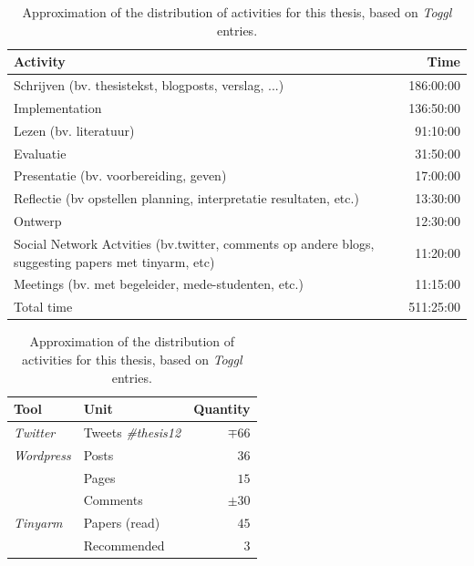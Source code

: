 \begin{table}%

	\caption{Approximation of the distribution of activities for this thesis, based on \emph{Toggl} entries.}
	
	\begin{center}
		\begin{tabular}{ p{350px} | r }
			\hline
			\textbf{Activity} & \textbf{Time} \\
			\hline
			Schrijven (bv. thesistekst, blogposts, verslag, ...) 																								& 186:00:00 \\
			Implementation 																																											& 136:50:00 \\
			Lezen (bv. literatuur) 																																							& 91:10:00 \\
			Evaluatie 																																													& 31:50:00 \\
			Presentatie (bv. voorbereiding, geven) 																															& 17:00:00 \\
			Reflectie (bv opstellen planning, interpretatie resultaten, etc.) 																	& 13:30:00 \\
			Ontwerp 																																														& 12:30:00 \\
			Social Network Actvities (bv.twitter, comments op andere blogs, suggesting papers met tinyarm, etc) & 11:20:00 \\
			Meetings (bv. met begeleider, mede-studenten, etc.) 																								& 11:15:00 \\
			\hline
			\hline
			Total time 																																													& 511:25:00 \\
			\hline
		\end{tabular}
	\end{center}
	\label{table:toggl:stats}
\end{table}


\begin{table}%

	\caption{Approximation of the distribution of activities for this thesis, based on \emph{Toggl} entries.}
	
	\begin{center}
		\begin{tabular}{ l | l | r }
			\hline
			\textbf{Tool} 		& \textbf{Unit} 						& \textbf{Quantity} \\
			\hline
			\emph{Twitter} 		& Tweets \emph{\#thesis12}	& $\mp66$		\\
			\emph{Wordpress}	& Posts 										& $36$		\\
												& Pages 										& $15$		\\
												& Comments 									& $\pm30$	\\
			\emph{Tinyarm}		& Papers (read)							&	$45$		\\
												& Recommended								&	$3$			\\
			\hline
		\end{tabular}
	\end{center}
	\label{table:socialmedia:stats}
\end{table}


